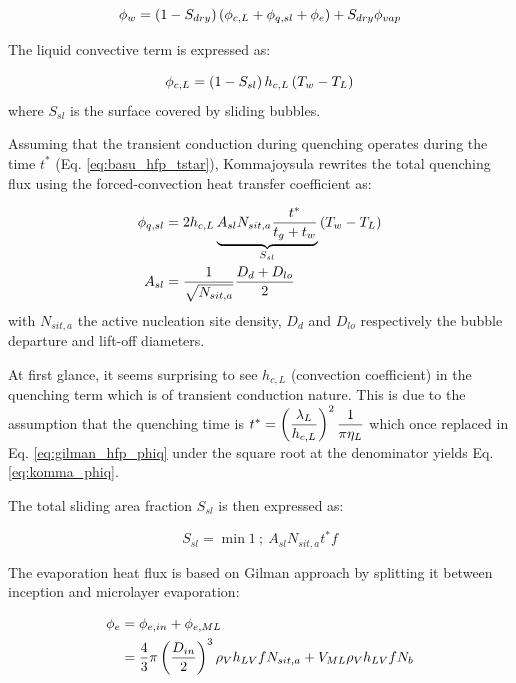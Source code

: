 \begin{equation}
\phi_{w} = \left( 1-S_{dry} \right)\left( \phi_{c,L} + \phi_{q,sl} + \phi_{e} \right) + S_{dry} \phi_{vap}
\end{equation}

The liquid convective term is expressed as:

\begin{equation}
\phi_{c,L} = \left( 1-S_{sl} \right)h_{c,L}\left( T_{w} - T_{L} \right)
\end{equation}
where $S_{sl}$ is the surface covered by sliding bubbles.

\npar

Assuming that the transient conduction during quenching operates during the time $t^{*}$ (Eq. \ref{eq:basu_hfp_tstar}), Kommajoysula rewrites the total quenching flux using the forced-convection heat transfer coefficient as:

\begin{align}
\phi_{q,sl} &= 2 h_{c,L} \underbrace{ A_{sl} N_{sit,a} \frac{t^{*}}{t_{g}+t_{w}} }_{S_{sl}} \left( T_{w}-T_{L} \right)\\
A_{sl} &= \dfrac{1}{\sqrt{N_{sit,a}}} \frac{D_{d} + D_{lo}}{2}
\label{eq:komma_phiq}
\end{align}
with $N_{sit,a}$ the active nucleation site density, $D_{d}$ and $D_{lo}$ respectively the bubble departure and lift-off diameters.

\begin{note*}{}
At first glance, it seems surprising to see $h_{c,L}$ (convection coefficient) in the quenching term which is of transient conduction nature. This is due to the assumption that the quenching time is $t^{*}=\left( \dfrac{\lambda_{L}}{h_{c,L}} \right)^{2} \dfrac{1}{\pi \eta_{L}}$ which once replaced in Eq. \ref{eq:gilman_hfp_phiq} under the square root at the denominator yields Eq. \ref{eq:komma_phiq}.
\end{note*}

\npar

The total sliding area fraction $S_{sl}$ is then expressed as:

\begin{equation}
S_{sl} = \min{1\ ;\ A_{sl}N_{sit,a}t^{*}f}
\end{equation}

The evaporation heat flux is based on Gilman approach by splitting it between inception and microlayer evaporation:

\begin{align}
\phi_{e} &= \phi_{e,in} + \phi_{e,ML} \\
&= \frac{4}{3}\pi \left( \frac{D_{in}}{2} \right)^{3}\rho_{V} h_{LV} f N_{sit,a} + V_{ML} \rho_{V} h_{LV} f N_{b}
\end{align}


